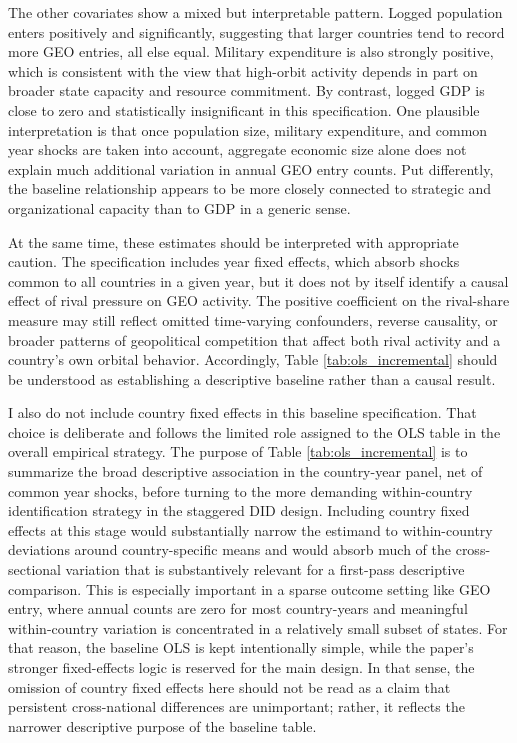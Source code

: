 \documentclass[11pt]{article}
\begin{document}
The other covariates show a mixed but interpretable pattern. Logged population enters positively and significantly, suggesting that larger countries tend to record more GEO entries, all else equal. Military expenditure is also strongly positive, which is consistent with the view that high-orbit activity depends in part on broader state capacity and resource commitment. By contrast, logged GDP is close to zero and statistically insignificant in this specification. One plausible interpretation is that once population size, military expenditure, and common year shocks are taken into account, aggregate economic size alone does not explain much additional variation in annual GEO entry counts. Put differently, the baseline relationship appears to be more closely connected to strategic and organizational capacity than to GDP in a generic sense.

At the same time, these estimates should be interpreted with appropriate caution. The specification includes year fixed effects, which absorb shocks common to all countries in a given year, but it does not by itself identify a causal effect of rival pressure on GEO activity. The positive coefficient on the rival-share measure may still reflect omitted time-varying confounders, reverse causality, or broader patterns of geopolitical competition that affect both rival activity and a country's own orbital behavior. Accordingly, Table \ref{tab:ols_incremental} should be understood as establishing a descriptive baseline rather than a causal result.

I also do not include country fixed effects in this baseline specification. That choice is deliberate and follows the limited role assigned to the OLS table in the overall empirical strategy. The purpose of Table \ref{tab:ols_incremental} is to summarize the broad descriptive association in the country-year panel, net of common year shocks, before turning to the more demanding within-country identification strategy in the staggered DID design. Including country fixed effects at this stage would substantially narrow the estimand to within-country deviations around country-specific means and would absorb much of the cross-sectional variation that is substantively relevant for a first-pass descriptive comparison. This is especially important in a sparse outcome setting like GEO entry, where annual counts are zero for most country-years and meaningful within-country variation is concentrated in a relatively small subset of states. For that reason, the baseline OLS is kept intentionally simple, while the paper's stronger fixed-effects logic is reserved for the main design. In that sense, the omission of country fixed effects here should not be read as a claim that persistent cross-national differences are unimportant; rather, it reflects the narrower descriptive purpose of the baseline table.
\end{document}
